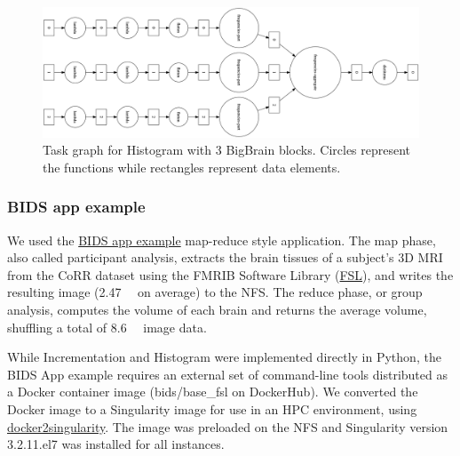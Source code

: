 \documentclass[conference]{IEEEtran}
\begin{document}
\begin{figure}[!t]
    \centering
    \includegraphics[height=\columnwidth,
    angle=-90]{images/histogram-task-graph.png}
    \caption{Task graph for Histogram with 3 BigBrain blocks. Circles represent the
    functions while rectangles represent data elements.
    }\label{fig:tg-histo}
\end{figure}

\subsubsection{BIDS app example}

We used the
\href{https://github.com/BIDS-Apps/example}{BIDS app example} map-reduce style 
application. The map phase, also called participant analysis, extracts the brain
tissues of a subject's 3D MRI from the CoRR dataset using the FMRIB Software Library
(\href{https://fsl.fmrib.ox.ac.uk/fsl/fslwiki}{FSL}), and writes the resulting
image (\SI{2.47}{\mega\byte} on average) to the NFS. The reduce phase, or group
analysis, computes the volume of each brain and returns the average
volume, shuffling a total of \SI{8.6}{\giga\byte} image data.

While Incrementation and Histogram were implemented directly in Python, the 
BIDS App example requires an external set of command-line tools distributed as a Docker container image
(bids/base\_fsl on DockerHub). We converted the Docker image to a Singularity image for use in 
an HPC environment, using
\href{https://hub.docker.com/r/singularityware/docker2singularity/tags/}{docker2singularity}.
The image was preloaded on the NFS and Singularity version 3.2.1\-1.el7 was installed
for all instances.
\end{document}
